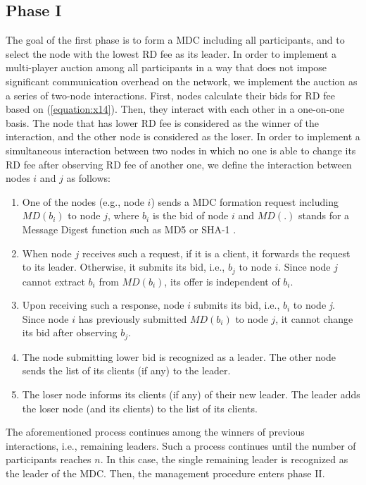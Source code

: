 \documentclass[journal,12pt, onecolumn]{IEEEtran}
\begin{document}
\subsection{Phase I}\label{section:Phase1}
The goal of the first phase is to form a MDC including all participants, and to select the node with the lowest RD fee as its leader. In order to implement a multi-player auction among all participants in a way that does not impose significant communication overhead on the network, we implement the auction as a series of two-node interactions.  
First, nodes calculate their bids for RD fee based on (\ref{equation:x14}). Then, they interact with each other in a one-on-one basis. The node that has lower RD fee is considered as the winner of the interaction, and the other node is considered as the loser. In order to implement a simultaneous interaction between two nodes in which no one is able to change its RD fee after observing RD fee of another one, we define the interaction between nodes $i$ and $j$ as follows:
\begin{enumerate}
\item One of the nodes (e.g., node $i$) sends a MDC formation request including $MD(b_i)$ to node $j$, where $b_i$ is the bid of node $i$ and $MD(.)$ stands for a Message Digest function such as MD5 \cite{x30} or SHA-1 \cite{x31}.
\item When node $j$ receives such a request, if it is a client, it forwards the request to its leader. Otherwise, it submits its bid, i.e., $b_j$ to node $i$. Since node $j$ cannot extract $b_i$ from $MD(b_i)$, its offer is independent of $b_i$.
\item Upon receiving such a response, node $i$ submits its bid, i.e., $b_i$ to node \textit{j}. Since node $i$ has previously submitted $MD(b_i)$ to node $j$, it cannot change its bid after observing $b_j$. 
\item The node submitting lower bid is recognized as a leader. The other node sends the list of its clients (if any) to the leader. 
\item The loser node informs its clients (if any) of their new leader. The leader adds the loser node (and its clients) to the list of its clients.

\end{enumerate}
The aforementioned process continues among the winners of previous interactions, i.e., remaining leaders. Such a process continues until the number of participants reaches $n$. In this case, the single remaining leader is recognized as the leader of the MDC. Then, the management procedure enters phase II.
\end{document}
